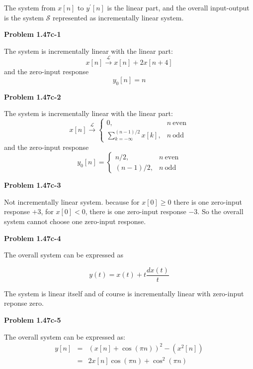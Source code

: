 \documentclass[koma,a4paper,utopia,12pt,listings-color,microtype,paralist,colorlinks,urlcolor=red]{org-article}
\begin{document}
The system from \(x[n]\) to \(y^{'}[n]\) is the linear part, and the overall
input-output is the system \(\mathcal{S}\) represented as incrementally linear system.

\textbf{Problem 1.47c-1}

The system is incrementally linear with the linear part:
\begin{equation*}
x[n] \xrightarrow{\mathcal{L}} x[n] + 2x[n+4]
\end{equation*}
and the zero-input response
\begin{equation*}
y_{0}[n] = n
\end{equation*}


\textbf{Problem 1.47c-2}

The system is incrementally linear with the linear part:
\begin{equation*}
x[n] \xrightarrow{\mathcal{L}}
\begin{cases}
0, & n\ \mathrm{even} \\
\sum_{k=-\infty}^{(n-1)/2}x[k], & n\ \mathrm{odd}
\end{cases}
\end{equation*}
and the zero-input response
\begin{equation*}
y_{0}[n] =
\begin{cases}
n/2 , & n\ \mathrm{even} \\
(n-1)/2, & n\ \mathrm{odd}
\end{cases}
\end{equation*}

\textbf{Problem 1.47c-3}

Not incrementally linear system. because for \(x[0] \geq 0\) there is one
zero-input response \(+3\), for \(x[0] < 0\), there is one zero-input response
\(-3\). So the overall system cannot choose one zero-input response.

\textbf{Problem 1.47c-4}

The overall system can be expressed as

\begin{equation*}
y(t) = x(t) + t\frac{dx(t)}{t}
\end{equation*}

The system is linear itself and of course is incrementally linear with zero-input
reponse zero.


\textbf{Problem 1.47c-5}

The overall system can be expressed as:
\begin{eqnarray*}
y[n]&=& (x[n] + \cos(\pi n))^{2} - (x^{2}[n]) \\
&=& 2x[n]\cos(\pi n) + \cos^{2}(\pi n)
\end{eqnarray*}
\end{document}
